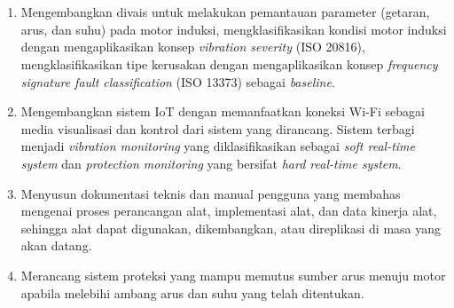 \documentclass{elsinta}
\begin{document}
\section{\ObjectivesTitle}

\subsection{\MainObjectiveTitle}
\begin{enumerate}
    \item   Mengembangkan divais untuk melakukan pemantauan parameter
            (getaran, arus, dan suhu) pada motor induksi, mengklasifikasikan
            kondisi motor induksi dengan mengaplikasikan konsep \textit{vibration
            severity} (ISO 20816), mengklasifikasikan tipe kerusakan dengan
            mengaplikasikan konsep \textit{frequency signature fault classification}
            (ISO 13373) sebagai \textit{baseline}.
    \item   Mengembangkan sistem IoT dengan memanfaatkan koneksi
            Wi-Fi sebagai media visualisasi dan kontrol dari sistem yang dirancang.
            Sistem terbagi menjadi \textit{vibration monitoring} yang
            diklasifikasikan sebagai \textit{soft real-time system} dan
            \textit{protection monitoring} yang bersifat \textit{hard real-time system}.
    \item   Menyusun dokumentasi teknis dan manual pengguna 
            yang membahas mengenai proses perancangan alat,
            implementasi alat, dan data kinerja alat, sehingga alat dapat digunakan,
            dikembangkan, atau direplikasi di masa yang akan datang.
    \item   Merancang sistem proteksi yang mampu memutus sumber arus
            menuju motor apabila melebihi ambang arus dan suhu yang telah
            ditentukan.

\end{enumerate}
\end{document}
